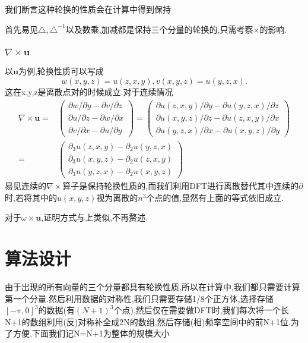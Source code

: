 \documentclass[UTF8]{ctexart}
\begin{document}
我们断言这种轮换的性质会在计算中得到保持

首先易见$\triangle,\triangle^{-1}$以及数乘,加减都是保持三个分量的轮换的,只需考察$\times$的影响.
\subsubsection{$\nabla \times \mathbf{u}$}
以$\mathbf{u}$为例,轮换性质可以写成
$$
w(x,y,z) = u(z,x,y),v(x,y,z)=u(y,z,x).
$$
这在x,y,z是离散点对的时候成立.对于连续情况
\begin{equation*}
\begin{split}
  \nabla \times \mathbf{u} = &
  \left(\begin{matrix}
    \partial w /\partial y - \partial v / \partial z \\
    \partial u /\partial z - \partial w / \partial x \\
    \partial v /\partial x - \partial u / \partial y
  \end{matrix}\right)=
  \left(\begin{matrix}
    \partial u(z,x,y) /\partial y - \partial u(y,z,x) / \partial z \\
    \partial u(x,y,z) /\partial z - \partial u(z,x,y) / \partial x \\
    \partial u(y,z,x) /\partial x - \partial u(x,y,z) / \partial y
  \end{matrix}\right) \\ =&
  \left(\begin{matrix}
    \partial_3 u(z,x,y) - \partial_2 u(y,z,x) \\
    \partial_3 u(x,y,z) - \partial_2 u(z,x,y) \\
    \partial_3 u(y,z,x) - \partial_2 u(x,y,z)
  \end{matrix}\right)
  \end{split}
\end{equation*}
易见连续的$\nabla \times$算子是保持轮换性质的,而我们利用DFT进行离散替代其中连续的$\partial$时,若将其中的$u(x,y,z)$视为离散的$n^3$个点的值,显然有上面的等式依旧成立.

对于$\omega \times \mathbf{u}$,证明方式与上类似,不再赘述.
\section{算法设计}
由于出现的所有向量的三个分量都具有轮换性质,所以在计算中,我们都只需要计算第一个分量.然后利用数据的对称性,我们只需要存储1/8个正方体,选择存储$[-\pi,0]^3$的数据(有$(N+1)^3$个点),然后仅在需要做DFT时,我们每次将一个长N+1的数组利用(反)对称补全成2N的数组,然后存储(相)频率空间中的前N+1位.为了方便,下面我们记N=N+1为整体的规模大小
\end{document}
